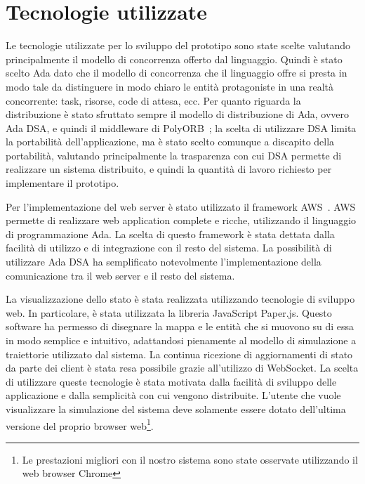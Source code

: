 \section{Tecnologie utilizzate}
Le tecnologie utilizzate per lo sviluppo del prototipo sono state scelte
valutando principalmente il modello di concorrenza offerto dal linguaggio.
Quindi è stato scelto Ada dato che il modello di concorrenza che il linguaggio
offre si presta in modo tale da distinguere in modo chiaro le entità
protagoniste in una realtà concorrente: task, risorse, code di attesa, ecc. Per
quanto riguarda la distribuzione è stato sfruttato sempre il modello di
distribuzione di Ada, ovvero Ada \ac{DSA}, e quindi il middleware di
PolyORB~\cite{polyorb}; la scelta di utilizzare DSA limita la portabilità
dell'applicazione, ma è stato scelto comunque a discapito della portabilità,
valutando principalmente la trasparenza con cui DSA permette di realizzare un
sistema distribuito, e quindi la quantità di lavoro richiesto per implementare
il prototipo.

Per l'implementazione del web server è stato utilizzato il framework
\ac{AWS}~\cite{aws}. \ac{AWS} permette di realizzare web application complete e
ricche, utilizzando il linguaggio di programmazione Ada. La scelta di questo
framework è stata dettata dalla facilità di utilizzo e di integrazione con il
resto del sistema. La possibilità di utilizzare Ada \ac{DSA} ha semplificato
notevolmente l'implementazione della comunicazione tra il web server e il resto
del sistema. 

La visualizzazione dello stato è stata realizzata utilizzando tecnologie di
sviluppo web. In particolare, è stata utilizzata la libreria JavaScript
Paper.js. Questo software ha permesso di disegnare la mappa e le entità che si
muovono su di essa in modo semplice e intuitivo, adattandosi pienamente al
modello di simulazione a traiettorie utilizzato dal sistema. La continua
ricezione di aggiornamenti di stato da parte dei client è stata resa possibile
grazie all'utilizzo di WebSocket. La scelta di utilizzare queste tecnologie è
stata motivata dalla facilità di sviluppo delle applicazione e dalla semplicità
con cui vengono distribuite. L'utente che vuole visualizzare la simulazione del
sistema deve solamente essere dotato dell'ultima versione del proprio browser
web\footnote{Le prestazioni migliori con il nostro sistema sono state osservate
utilizzando il web browser Chrome}. 
